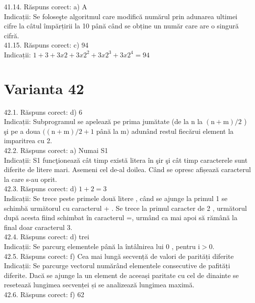 41.14. Răspuns corect: a) A\\
Indicații: Se foloseşte algoritmul care modifică numărul prin adunarea ultimei cifre la câtul împărțirii la 10 până când se obține un număr care are o singură cifră.\\

41.15. Răspuns corect: c) 94\\
Indicații: $1+3+3 x 2+3 x 2^{2}+3 x 2^{3}+3 x 2^{4}=94$\\

\section*{Varianta 42}

42.1. Răspuns corect: d) 6\\
Indicații: Subprogramul se apelează pe prima jumătate (de la n la $(\mathrm{n}+\mathrm{m}) / 2$ ) şi pe a doua $((\mathrm{n}+\mathrm{m}) / 2+1$ până la m$)$ adunând restul fiecărui element la imparitrea cu 2.\\

42.2. Răspuns corect: a) Numai S1\\
Indicații: S1 funcţionează cât timp există litera în şir şi cât timp caracterele sunt diferite de litere mari. Asemeni cel de-al doilea. Când se opresc afișează caracterul la care s-au oprit.\\

42.3. Răspuns corect: d) $1+2=3$\\
Indicații: Se trece peste primele două litere , când se ajunge la primul 1 se schimbă următorul cu caracterul + . Se trece la primul caracter de 2 , următorul după acesta fiind schimbat în caracterul =, urmând ca mai apoi să rămână la final doar caracterul 3.\\

42.4. Răspuns corect: d) trei\\
Indicații: Se parcurg elementele până la întâlnirea lui 0 , pentru $\mathrm{i}>0$.\\

42.5. Răspuns corect: f) Cea mai lungă secvență de valori de parități diferite\\
Indicații: Se parcurge vectorul numărând elementele consecutive de pafități diferite. Dacă se ajunge la un element de aceeași paritate cu cel de dinainte se resetează lungimea secvenței și se analizează lungimea maximă.\\

42.6. Răspuns corect: f) 62\\

